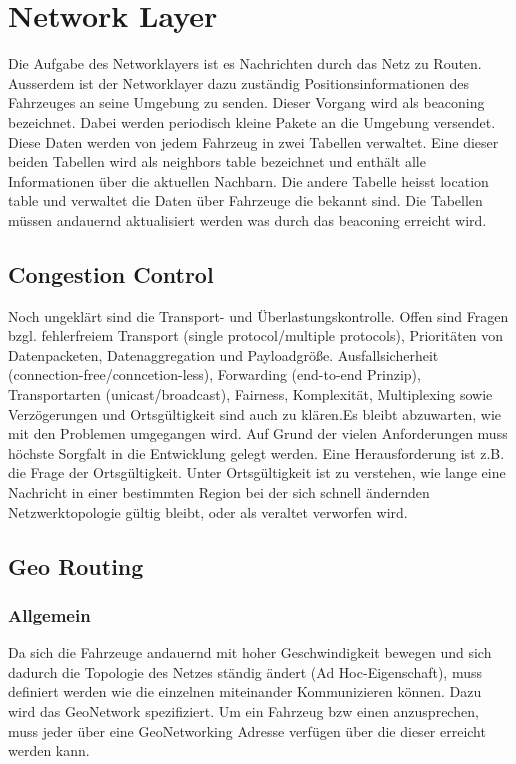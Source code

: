 \chapter{Network Layer\label{chap:networklayer}}
Die Aufgabe des Networklayers ist es Nachrichten durch das Netz zu Routen. Ausserdem ist der Networklayer dazu zuständig Positionsinformationen des Fahrzeuges an seine Umgebung zu senden. Dieser Vorgang wird als beaconing bezeichnet. Dabei werden periodisch kleine Pakete an die Umgebung versendet. Diese Daten werden von jedem Fahrzeug in zwei Tabellen verwaltet. Eine dieser beiden Tabellen wird als neighbors table bezeichnet und enthält alle Informationen über die aktuellen Nachbarn. Die andere Tabelle heisst location table und verwaltet die Daten über Fahrzeuge die bekannt sind. Die Tabellen müssen andauernd aktualisiert werden was durch das beaconing erreicht wird.

\section{Congestion Control\label{sec:congestioncontrol}}
Noch ungeklärt sind die Transport- und Überlastungskontrolle. Offen sind Fragen bzgl. fehlerfreiem Transport (single protocol/multiple protocols), Prioritäten von Datenpacketen, Datenaggregation und Payloadgröße. Ausfallsicherheit (connection-free/conncetion-less), Forwarding (end-to-end Prinzip), Transportarten (unicast/broadcast), Fairness, Komplexität, Multiplexing sowie Verzögerungen und Ortsgültigkeit sind auch zu klären.Es bleibt abzuwarten, wie mit den Problemen umgegangen wird. Auf Grund der vielen Anforderungen muss höchste Sorgfalt in die Entwicklung gelegt werden. Eine Herausforderung ist z.B. die Frage der Ortsgültigkeit. Unter Ortsgültigkeit ist zu verstehen, wie lange eine Nachricht in einer bestimmten Region bei der sich schnell ändernden Netzwerktopologie gültig bleibt, oder als veraltet verworfen wird.

\section{Geo Routing\label{sec:georouting}}
\subsection{Allgemein}
Da sich die Fahrzeuge andauernd mit hoher Geschwindigkeit bewegen und sich dadurch die Topologie des Netzes ständig ändert (Ad Hoc-Eigenschaft), muss definiert werden wie die einzelnen  miteinander Kommunizieren können. Dazu wird das GeoNetwork spezifiziert. Um ein Fahrzeug bzw einen  anzusprechen, muss jeder  über eine GeoNetworking Adresse verfügen über die dieser erreicht werden kann. 

